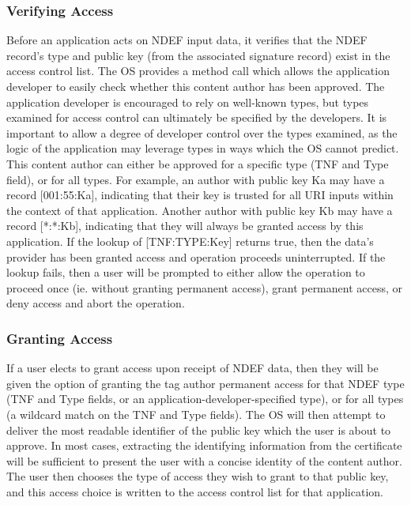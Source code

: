 \documentclass[12pt]{article}
\begin{document}
\subsubsection{Verifying Access}
Before an application acts on NDEF input data, it verifies that the NDEF record's type and public key (from the associated signature record) exist in the access control list.
The OS provides a method call which allows the application developer to easily check whether this content author has been approved.
The application developer is encouraged to rely on well-known types, but types examined for access control can ultimately be specified by the developers.
It is important to allow a degree of developer control over the types examined, as the logic of the application may leverage types in ways which the OS cannot predict.
This content author can either be approved for a specific type (TNF and Type field), or for all types.
For example, an author with public key Ka may have a record [001:55:Ka], indicating that their key is trusted for all URI inputs within the context of that application.
Another author with public key Kb may have a record [*:*:Kb], indicating that they will always be granted access by this application.
If the lookup of [TNF:TYPE:Key] returns true, then the data's provider has been granted access and operation proceeds uninterrupted.
If the lookup fails, then a user will be prompted to either allow the operation to proceed once (ie. without granting permanent access), grant permanent access, or deny access and abort the operation.
\subsubsection{Granting Access}
If a user elects to grant access upon receipt of NDEF data, then they will be given the option of granting the tag author permanent access for that NDEF type (TNF and Type fields, or an application-developer-specified type), or for all types (a wildcard match on the TNF and Type fields).
The OS will then attempt to deliver the most readable identifier of the public key which the user is about to approve.
In most cases, extracting the identifying information from the certificate will be sufficient to present the user with a concise identity of the content author.
The user then chooses the type of access they wish to grant to that public key, and this access choice is written to the access control list for that application.
\end{document}
